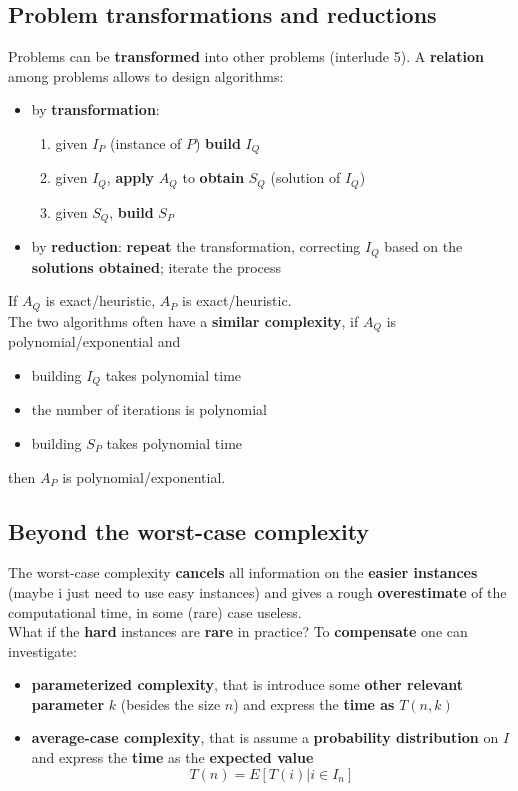 \documentclass[11pt]{article}
\begin{document}
	\subsection{Problem transformations and reductions}
	Problems can be \textbf{transformed} into other problems (interlude 5). A \textbf{relation} among problems allows to design algorithms: 
	\begin{itemize}
		\item by \textbf{transformation}: 
		\begin{enumerate}
			\item given $I_P$ (instance of $P$) \textbf{build} $I_Q$
			\item given $I_Q$, \textbf{apply} $A_Q$ to \textbf{obtain} $S_Q$ (solution of $I_Q$)
			\item given $S_Q$, \textbf{build} $S_P$
		\end{enumerate}
		\item by \textbf{reduction}: \textbf{repeat} the transformation, correcting $I_Q$ based on the \textbf{solutions obtained}; iterate the process
	\end{itemize}
	
	If $A_Q$ is exact/heuristic, $A_P$ is exact/heuristic.\\
	
	The two algorithms often have a \textbf{similar complexity}, if $A_Q$ is polynomial/exponential and
	\begin{itemize}
		\item building $I_Q$ takes polynomial time
		\item the number of iterations is polynomial
		\item building $S_P$ takes polynomial time
	\end{itemize}
	then $A_P$ is polynomial/exponential.\\
	
	\newpage
	
	\subsection{Beyond the worst-case complexity}
	The worst-case complexity \textbf{cancels} all information on the \textbf{easier instances} (maybe i just need to use easy instances) and gives a rough \textbf{overestimate} of the computational time, in some (rare) case useless.\\
	
	What if the \textbf{hard} instances are \textbf{rare} in practice? To \textbf{compensate} one can investigate: 
	\begin{itemize}
		\item \textbf{parameterized complexity}, that is introduce some \textbf{other relevant parameter} $k$ (besides the size $n$) and express the \textbf{time as} $T(n,k)$
		\item \textbf{average-case complexity}, that is assume a \textbf{probability distribution} on $I$ and express the \textbf{time} as the \textbf{expected value}
		$$ T(n) = E \left[T(i) | i \in I_n \right] $$
	\end{itemize}
	
\end{document}
